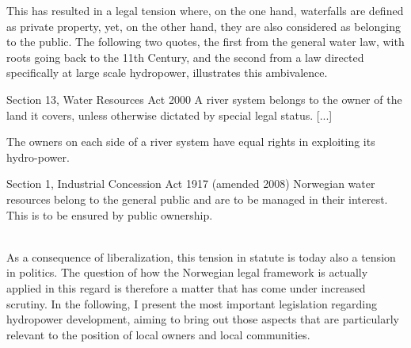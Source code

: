 
This has resulted in a legal tension where, on the one hand, waterfalls are defined as private property, yet, on the other hand, they are also considered as belonging to the public. The following two quotes, the first from the general water law, with roots going back  to the 11th Century, and the second from a law directed specifically at large scale hydropower, illustrates this ambivalence.

{\begin{minipage}[t]{16em}
 \begin{aquote}{\tiny Section 13, Water Resources Act 2000} \footnotesize A river system belongs to the owner of the land it covers, unless otherwise dictated by special legal status. [...]

The owners on each side of a river system have equal rights in exploiting its hydro-power.
\end{aquote}  
\end{minipage}}
{\begin{minipage}[t]{22em}
\begin{aquote}{\tiny Section 1, Industrial Concession Act 1917 (amended 2008)} \footnotesize Norwegian water resources belong to the general public and are to be managed in their interest. This is to be ensured by public ownership.
\end{aquote}
\end{minipage}} \\

As a consequence of liberalization, this tension in statute is today also a tension in politics. The question of how the Norwegian legal framework is actually applied in this regard is therefore a matter that has come under increased scrutiny. In the following, I present the most important legislation regarding hydropower development, aiming to bring out those aspects that are particularly relevant to the position of local owners and local communities.


